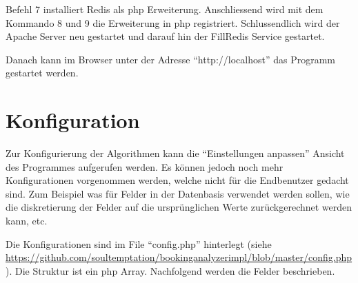 Befehl 7 installiert Redis als \gls{php} Erweiterung. Anschliessend wird mit dem Kommando 8 und 9 die Erweiterung in \gls{php} registriert. Schlussendlich wird der Apache Server neu gestartet und darauf hin der FillRedis Service gestartet.

Danach kann im Browser unter der Adresse "`http://localhost"' das Programm gestartet werden.

\section{Konfiguration}
\label{sec:proofofconcept:konfiguration}
Zur Konfigurierung der Algorithmen kann die "`Einstellungen anpassen"' Ansicht des Programmes aufgerufen werden. Es können jedoch noch mehr Konfigurationen vorgenommen werden, welche nicht für die Endbenutzer gedacht sind. Zum Beispiel was für Felder in der Datenbasis verwendet werden sollen, wie die diskretierung der Felder auf die ursprünglichen Werte zurückgerechnet werden kann, etc. 

Die Konfigurationen sind im File "`config.php"' hinterlegt (siehe \url{https://github.com/soultemptation/bookinganalyzerimpl/blob/master/config.php}). Die Struktur ist ein \gls{php} Array. Nachfolgend werden die Felder beschrieben.


